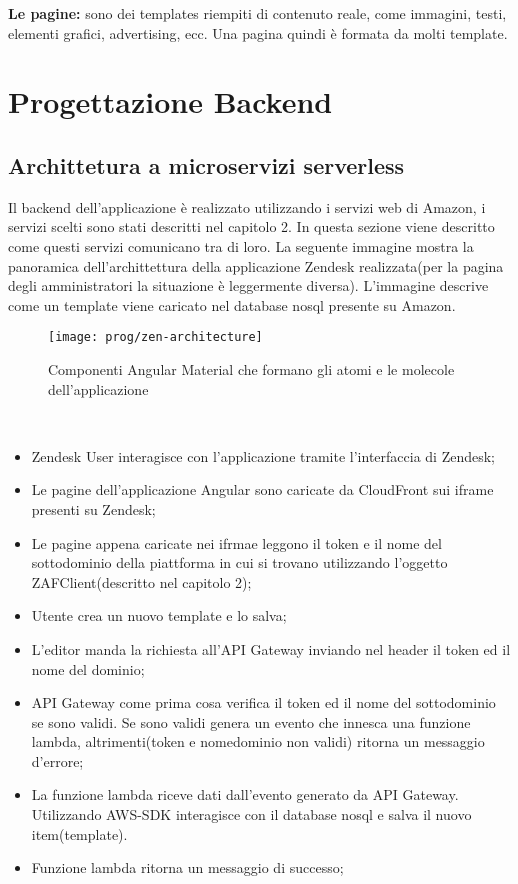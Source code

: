 \textbf{Le pagine:} sono dei templates riempiti di contenuto reale, come immagini, testi, elementi grafici, advertising, ecc. Una pagina quindi è formata da molti template. 
\newpage
\section{Progettazione Backend}
\subsection{Archittetura a microservizi serverless}
Il backend dell'applicazione è realizzato utilizzando i servizi web di Amazon, i servizi scelti sono stati descritti nel capitolo 2. In questa sezione viene descritto come questi servizi comunicano tra di loro. La seguente immagine mostra la panoramica dell'archittettura della applicazione Zendesk realizzata(per la pagina degli amministratori la situazione è leggermente diversa). L'immagine descrive come un template viene caricato nel database nosql presente su Amazon. 
\begin{figure}[!h] 
	\centering 
	\texttt{[image: prog/zen-architecture]} 
	\caption{Componenti Angular Material che formano gli atomi e le molecole dell'applicazione}
\end{figure} 
\\
\begin{itemize}
	\item Zendesk User interagisce con l'applicazione tramite l'interfaccia di Zendesk;
	\item Le pagine dell'applicazione Angular sono caricate da CloudFront sui iframe presenti su Zendesk;
	\item Le pagine appena caricate nei ifrmae leggono il token e il nome del sottodominio della piattforma in cui si trovano utilizzando l'oggetto ZAFClient(descritto nel capitolo 2);
	\item Utente crea un nuovo template e lo salva;
	\item L'editor manda la richiesta all'API Gateway inviando nel header il token ed il nome del dominio;
	\item API Gateway come prima cosa verifica il token ed il nome del sottodominio se sono validi. Se sono validi genera un evento che innesca una funzione lambda, altrimenti(token e nomedominio non validi) ritorna un messaggio d'errore;
	\item La funzione lambda riceve dati dall'evento generato da API Gateway. Utilizzando AWS-SDK interagisce con il database nosql e salva il nuovo item(template).
	\item Funzione lambda ritorna un messaggio di successo;
\end{itemize}
